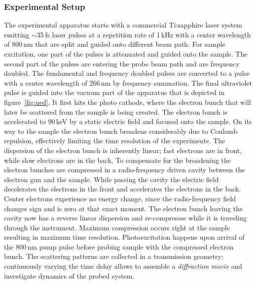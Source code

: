 \subsubsection*{Experimental Setup}
The experimental apparatus starts with a commercial Ti:sapphire laser system emitting $\sim$35\,fs laser pulses at a repetition rate of 1\,kHz with a center wavelength of 800\,nm that are split and guided onto different beam path\cite{chatelain2012}.
For sample excitation, one part of the pulses is attenuated and guided onto the sample.
The second part of the pulses are entering the probe beam path and are frequency doubled. The fundamental and frequency doubled pulses are converted to a pulse with a center wavelength of 266\,nm by frequency summation.
The final ultraviolet pulse is guided into the vacuum part of the apparatus that is depicted in figure~\ref{fig:ued}.
It first hits the photo cathode, where the electron bunch that will later be scattered from the sample is being created.
The electron bunch is accelerated to 90\,keV by a static electric field and focused onto the sample.
On its way to the sample the electron bunch broadens considerably due to Coulomb repulsion, effectively limiting the time resolution of the experiments.
The dispersion of the electron bunch is inherently linear; fast electrons are in front, while slow electrons are in the back.
To compensate for the broadening the electron bunches are compressed in a radio-frequency driven cavity between the electron gun and the sample\cite{otto2017}.
While passing the cavity the electric field decelerates the electrons in the front and accelerates the electrons in the back.
Center electrons experience no energy change, since the radio-frequency field changes sign and is zero at that exact moment.
The electron bunch leaving the cavity now has a reverse linear dispersion and re-compresses while it is traveling through the instrument.
Maximum compression occurs right at the sample resulting in maximum time resolution.
Photoexcitation happens upon arrival of the 800\,nm pump pulse before probing sample with the compressed electron bunch.
The scattering patterns are collected in a transmission geometry; continuously varying the time delay allows to assemble a \emph{diffraction movie} and investigate dynamics of the probed system.

